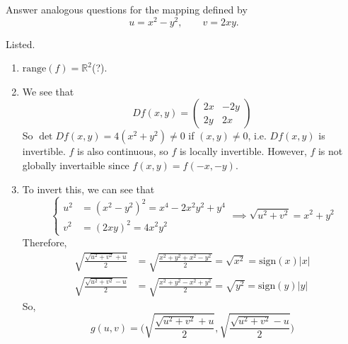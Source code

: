 	\begin{exercise}[Rudin 9.18]
		Answer analogous questions for the mapping defined by
		\begin{equation}
			u=x^2-y^2,
			\qquad
			v=2xy.
		\end{equation}
	\end{exercise}
	\begin{solution}
	  Listed. 
		\begin{enumerate}
			\item $\mathrm{range}(f) = \mathbb{R}^2$(?). 
			\item We see that 
				\begin{equation}
					Df(x, y) = \begin{pmatrix} 2x & -2y \\ 2y & 2x \end{pmatrix} 
				\end{equation}
				So $\det Df(x, y) = 4(x^2 + y^2) \neq 0$ if $(x, y) \neq 0$, i.e. $Df(x,y)$ is invertible. $f$ is also continuous, so $f$ is locally invertible. However, $f$ is not globally invertaible since $f(x, y) = f(-x, -y)$. 

			\item To invert this, we can see that 
				\begin{equation}
					\begin{cases} 
						u^2 & = (x^2 - y^2)^2 = x^4 - 2x^2 y^2 + y^4 \\ 
						v^2 & = (2xy)^2 = 4x^2 y^2
					\end{cases} \implies \sqrt{u^2 + v^2} = x^2 + y^2
				\end{equation}
				Therefore, 
				\begin{align}
					\sqrt{\frac{\sqrt{u^2 + v^2} + u}{2}} & = \sqrt{\frac{x^2 + y^2 + x^2 - y^2}{2}} = \sqrt{x^2} = \mathrm{sign}(x) |x| \\ 
					\sqrt{\frac{\sqrt{u^2 + v^2} - u}{2}} & = \sqrt{\frac{x^2 + y^2 - x^2 + y^2}{2}} = \sqrt{y^2} = \mathrm{sign}(y) |y|
				\end{align}
				So, 
				\begin{equation}
				  g(u, v) = \bigg( \sqrt{\frac{\sqrt{u^2 + v^2} + u}{2}}, \sqrt{\frac{\sqrt{u^2 + v^2} - u}{2}} \bigg)
				\end{equation}


\end{enumerate}
\end{solution}
